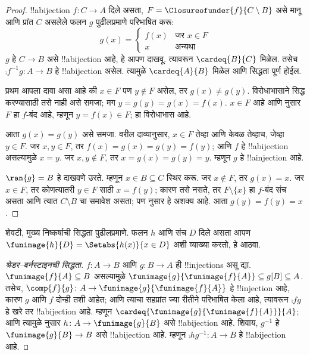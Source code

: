 \documentclass[../../../include/open-logic-section]{subfiles}
\begin{document}
\begin{proof}
!!a{bijection}  $f \colon C \to A$ दिले असता, $F =
\Closureofunder{f}{C \setminus B}$ असे मानू आणि प्रांत $C$ असलेले फलन
$g$ पुढीलप्रमाणे परिभाषित करू:
\[
	g(x) =
	\begin{cases}
			f(x) &\text{जर $x \in F$}\\
			x & \text{अन्यथा}
	\end{cases}
\]
$g$ हे $C \to B$ असे !!a{bijection} आहे, हे आपण दाखवू. त्यावरून
$\cardeq{B}{C}$ मिळेल. तसेच $\comp{f^{-1}}{g} \colon A \to B$ हे
!!a{bijection} असेल. त्यामुळे $\cardeq{A}{B}$ मिळेल आणि सिद्धता पूर्ण होईल.

प्रथम आपला दावा असा आहे की $x \in F$ पण $y\notin F$ असेल, तर $g(x) \neq
g(y)$. विरोधाभासाने सिद्ध करण्यासाठी तसे नाही असे समजा; मग $y = g(y) =
g(x) = f(x)$. $x \in F$ आहे आणि  नुसार $F$ हा
$f$-बंद आहे, म्हणून $y = f(x) \in F$; हा विरोधाभास आहे.

आता $g(x) = g(y)$ असे समजा. वरील दाव्यानुसार, $x \in F$ तेव्हा आणि
केवळ तेव्हाच, जेव्हा $y \in F$. जर $x, y \in F$, तर $f(x) = g (x) =
g(y) = f(y)$; आणि $f$ हे !!a{bijection} असल्यामुळे $x = y$. जर
$x, y \notin F$, तर $x = g(x) = g(y) = y$. म्हणून $g$ हे
!!a{injection} आहे.

$\ran{g} = B$ हे दाखवणे उरते. म्हणून $x \in B \subseteq C$ स्थिर करू.
जर $x \notin F$, तर $g(x) = x$. जर $x \in F$, तर कोणत्यातरी
$y \in F$ साठी $x = f(y)$; कारण तसे नसते, तर $F \setminus \{x\}$ हा
$f$-बंद संच असता आणि त्यात $C\setminus B$ चा समावेश असता; पण
 नुसार हे अशक्य आहे. आता $g(y) = f(y) = x$.
\end{proof}

शेवटी, मुख्य निष्कर्षाची सिद्धता पुढीलप्रमाणे. फलन $h$ आणि संच $D$ दिले
असता आपण $\funimage{h}{D} = \Setabs{h(x)}{x \in D}$ अशी व्याख्या करतो,
हे आठवा.

\begin{proof}[श्रेडर--बर्नस्टाइनची सिद्धता] $f \colon A \to B$
आणि $g \colon B \to A$ ही !!{injection}s असू द्या.
$\funimage{f}{A} \subseteq B$ असल्यामुळे
$\funimage{g}{\funimage{f}{A}} \subseteq g[B] \subseteq A$.
तसेच, $\comp{f}{g} \colon A \to
\funimage{g}{\funimage{f}{A}}$ हे !!{injection} आहे, कारण $g$ आणि
$f$ दोन्ही तशी आहेत; आणि त्याचा सहप्रांत ज्या रीतीने परिभाषित केला आहे,
त्यावरून $\comp{f}{g}$ हे खरे तर !!a{bijection} आहे. म्हणून
$\cardeq{\funimage{g}{\funimage{f}{A}}}{A}$; आणि त्यामुळे
 नुसार $h \colon A \to \funimage{g}{B}$ असे
!!a{bijection} आहे. शिवाय, $g^{-1}$ हे
$\funimage{g}{B} \to B$ असे !!a{bijection} आहे. म्हणून
$\comp{h}{g^{-1}} \colon A \to B$ हे !!a{bijection} आहे.
\end{proof}
\end{document}
